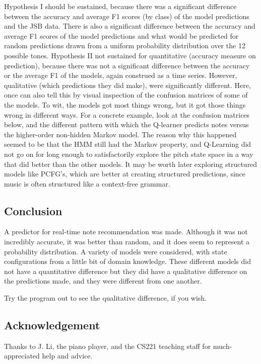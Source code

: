 \documentclass{article}
\begin{document}
Hypothesis I should be sustained, because there was a significant difference between the accuracy and average F1 scores (by class) of the model predictions and the JSB data. There is also a significant difference between the accuracy and average F1 scores of the model predictions and what would be predicted for random predictions drawn from a uniform probability distribution over the 12 possible tones.
Hypothesis II not sustained for quantitative (accuracy measure on prediction), because there was not a significant difference between the accuracy or the average F1 of the models, again construed as a time series.
However, qualitative (which predictions they did make), were significantly different. Here, once can also tell this by visual inspection of the confusion matrices of some of the models. To wit, the models got most things wrong, but it got those things wrong in different ways. For a concrete example, look at the confusion matrices below, and the different pattern with which the Q-learner predicts notes versus the higher-order non-hidden Markov model.
The reason why this happened seemed to be that the HMM still had the Markov property, and Q-Learning did not go on for long enough to satisfactorily explore the pitch state space in a way that did better than the other models. It may be worth later exploring structured models like PCFG's, which are better at creating structured predictions, since music is often structured like a context-free grammar.

\subsection*{Conclusion}
A predictor for real-time note recommendation was made.
Although it was not incredibly accurate, it was better than random, and it does seem to represent a probability distribution.
A variety of models were considered, with state configurations from a little bit of domain knowledge.
These different models did not have a quantitative difference but they did have a qualitative difference on the predictions made, and they were different from one another.

Try the program out to see the qualitative difference, if you wish.

\subsection*{Acknowledgement}
Thanks to J. Li, the piano player, and the CS221 teaching staff for much-appreciated help and advice.
\end{document}
